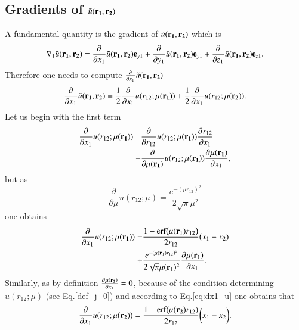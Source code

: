 \documentclass[aip,jcp,reprint,noshowkeys,superscriptaddress]{revtex4-1}
\newcommand{\deriv}[3]{\frac{\partial^{#3} #1}{\partial {#2}^{#3}}}
\newcommand{\bd}[1]{{\bf {#1}}}
\newcommand{\bri}[1]{{\bf r}_{#1}}
\newcommand{\mur}[1]{\mu({\bf r_{#1}})}
\begin{document}
\subsection{Gradients of $\tilde{u}(\bd{r_1},\bd{r_2})$}
A fundamental quantity is the gradient of $\tilde{u}(\bd{r_1},\bd{r_2})$ which is 
\begin{equation}
 \nabla_1 \tilde{u}(\bd{r_1},\bd{r_2}) = \deriv{}{x_1}{} \tilde{u}(\bd{r_1},\bd{r_2}) {\bf e}_{y1} + \deriv{}{y_1}{} \tilde{u}(\bd{r_1},\bd{r_2}) {\bf e}_{y1} + \deriv{}{z_1}{} \tilde{u}(\bd{r_1},\bd{r_2}) {\bf e}_{z1}.
\end{equation}
Therefore one needs to compute $\deriv{}{x_1}{} \tilde{u}(\bd{r_1},\bd{r_2})$
\begin{equation}
 \deriv{}{x_1}{} \tilde{u}(\bd{r_1},\bd{r_2}) = \frac{1}{2}\deriv{}{x_1}{} u(r_{12};\mur{1}) 
                                               +\frac{1}{2}\deriv{}{x_1}{} u(r_{12};\mur{2}) .
\end{equation}
Let us begin with the first term 
\begin{equation}
 \begin{aligned}
 \deriv{}{x_1}{} u(r_{12};\mur{1})=& \deriv{}{r_{12}}{} u(r_{12};\mur{1})\deriv{r_{12}}{x_1}{} \\ 
                                  +& \deriv{}{\mur{1}}{}u(r_{12};\mur{1}) \deriv{\mur{1}}{x_1}{},
 \end{aligned}
\end{equation}
but as 
\begin{equation}
 \deriv{}{\mu}{}u(r_{12};\mu) = \frac{e^{-(\mu r_{12})^2}}{2 \sqrt{\pi} \mu^2}
\end{equation}
one obtains 
\begin{equation}
 \begin{aligned}
 \deriv{}{x_1}{} u(r_{12};\mur{1}) =& \frac{1 - \text{erf}\big(\mu(\bri{1}) r_{12} \big)}{2 r_{12}}\big( x_1 - x_2) \\
                                   +&\frac{e^{-(\mu(\bri{1}) r_{12})^2}}{2 \sqrt{\pi} \mu(\bri{1})^2} \deriv{\mur{1}}{x_1}{}.  
 \end{aligned}
\end{equation}
Similarly, as by definition $\deriv{\mur{2}}{x_1}{} = 0$, because 
of the condition determining $u(r_{12};\mu)$ (see Eq.\eqref{def_j_0}) and according to Eq.\eqref{eq:dx1_u} one obtains that 
\begin{equation}
 \deriv{}{x_1}{} u(r_{12};\mur{2}) = \frac{1 - \text{erf}(\mur{2} r_{12})}{2 r_{12}} \bigg(x_1 - x_2 \bigg).
\end{equation}
\end{document}
